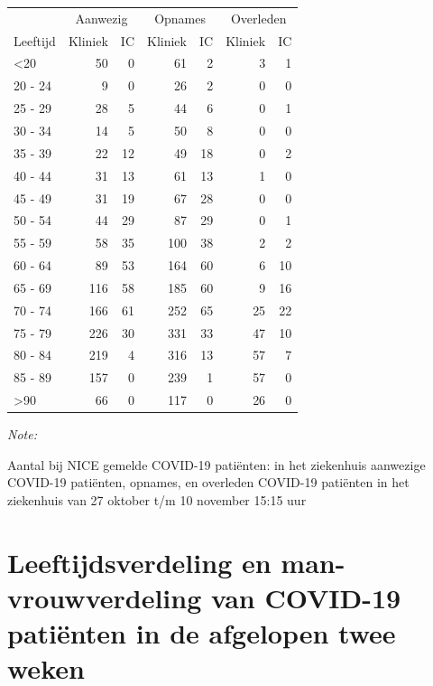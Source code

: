 \documentclass[
  english,
  man,floatsintext]{apa6}
\begin{document}
\begin{table}
\centering\begingroup\fontsize{10}{12}\selectfont

\begin{threeparttable}
\begin{tabular}{lrrrrrr}
\toprule
\multicolumn{1}{c}{ } & \multicolumn{2}{c}{Aanwezig} & \multicolumn{2}{c}{Opnames} & \multicolumn{2}{c}{Overleden} \\
\cmidrule(l{3pt}r{3pt}){2-3} \cmidrule(l{3pt}r{3pt}){4-5} \cmidrule(l{3pt}r{3pt}){6-7}
Leeftijd & Kliniek & IC & Kliniek & IC & Kliniek & IC\\
\midrule
<20 & 50 & 0 & 61 & 2 & 3 & 1\\
20 - 24 & 9 & 0 & 26 & 2 & 0 & 0\\
25 - 29 & 28 & 5 & 44 & 6 & 0 & 1\\
30 - 34 & 14 & 5 & 50 & 8 & 0 & 0\\
35 - 39 & 22 & 12 & 49 & 18 & 0 & 2\\
40 - 44 & 31 & 13 & 61 & 13 & 1 & 0\\
45 - 49 & 31 & 19 & 67 & 28 & 0 & 0\\
50 - 54 & 44 & 29 & 87 & 29 & 0 & 1\\
55 - 59 & 58 & 35 & 100 & 38 & 2 & 2\\
60 - 64 & 89 & 53 & 164 & 60 & 6 & 10\\
65 - 69 & 116 & 58 & 185 & 60 & 9 & 16\\
70 - 74 & 166 & 61 & 252 & 65 & 25 & 22\\
75 - 79 & 226 & 30 & 331 & 33 & 47 & 10\\
80 - 84 & 219 & 4 & 316 & 13 & 57 & 7\\
85 - 89 & 157 & 0 & 239 & 1 & 57 & 0\\
>90 & 66 & 0 & 117 & 0 & 26 & 0\\
\bottomrule
\end{tabular}
\begin{tablenotes}
\item \textit{Note: } 
\item Aantal bij NICE gemelde COVID-19 patiënten: in het ziekenhuis aanwezige COVID-19 patiënten, opnames, en overleden COVID-19 patiënten in het ziekenhuis van 27 oktober t/m 10 november 15:15 uur
\end{tablenotes}
\end{threeparttable}
\endgroup{}
\end{table}

\newpage

\hypertarget{leeftijdsverdeling-en-man-vrouwverdeling-van-covid-19-patiuxebnten-in-de-afgelopen-twee-weken}{%
\section{Leeftijdsverdeling en man-vrouwverdeling van COVID-19 patiënten in de afgelopen twee weken}\label{leeftijdsverdeling-en-man-vrouwverdeling-van-covid-19-patiuxebnten-in-de-afgelopen-twee-weken}}
\end{document}
